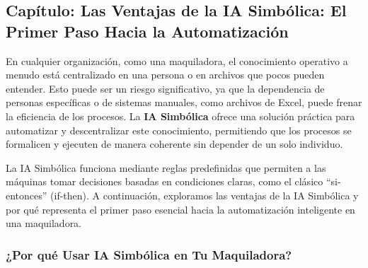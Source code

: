 \documentclass[
  10pt,
  letterpaper,
]{book}
\begin{document}
\subsection{Capítulo: Las Ventajas de la IA Simbólica: El Primer Paso
Hacia la
Automatización}\label{capuxedtulo-las-ventajas-de-la-ia-simbuxf3lica-el-primer-paso-hacia-la-automatizaciuxf3n}

En cualquier organización, como una maquiladora, el conocimiento
operativo a menudo está centralizado en una persona o en archivos que
pocos pueden entender. Esto puede ser un riesgo significativo, ya que la
dependencia de personas específicas o de sistemas manuales, como
archivos de Excel, puede frenar la eficiencia de los procesos. La
\textbf{IA Simbólica} ofrece una solución práctica para automatizar y
descentralizar este conocimiento, permitiendo que los procesos se
formalicen y ejecuten de manera coherente sin depender de un solo
individuo.

La IA Simbólica funciona mediante reglas predefinidas que permiten a las
máquinas tomar decisiones basadas en condiciones claras, como el clásico
``si-entonces'' (if-then). A continuación, exploramos las ventajas de la
IA Simbólica y por qué representa el primer paso esencial hacia la
automatización inteligente en una maquiladora.

\subsubsection{¿Por qué Usar IA Simbólica en Tu
Maquiladora?}\label{por-quuxe9-usar-ia-simbuxf3lica-en-tu-maquiladora}
\end{document}

